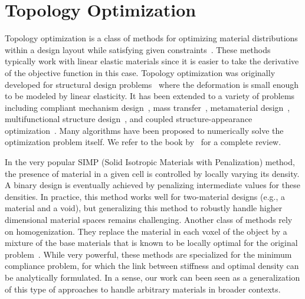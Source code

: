 \section{Topology Optimization}
Topology optimization is a class of methods for optimizing material distributions
within a design layout while satisfying given constraints~\citep{bendsoe2004topology}.
These methods typically work with linear elastic materials since it is easier to take the derivative of the objective function in this case.
Topology optimization was originally developed for structural design problems~\citep{bendsoe:1989:optimal} where the deformation is small enough to be modeled by linear elasticity.
It has been extended to a variety of problems including compliant mechanism design~\citep{Sigmund97Compliant},
mass transfer~\citep{challis:2009:level},
metamaterial design~\citep{Sigmund2000,cadman:2013:design},
multifunctional structure design~\citep{yan:2015:two},
and coupled structure-appearance optimization~\citep{Martinez:2015:SAO}.
Many algorithms have been proposed to numerically solve the optimization problem itself.
We refer to the book by~\citet{sigmund:2013:topology} for a complete review.

In the very popular SIMP (Solid Isotropic Materials with Penalization) method,
the presence of material in a given cell is controlled by locally varying its density.
A binary design is eventually achieved by penalizing intermediate values for these densities.
In practice, this method works well for two-material
designs (e.g., a material and a void), but generalizing this method
to robustly handle higher dimensional material spaces remains challenging.
Another class of methods rely on homogenization.
They replace the material in each voxel of the object by a mixture of the base materials that is known to be locally optimal for the
original problem~\citep{Allaire2012}.
While very powerful, these methods are specialized for the minimum compliance problem, for
which the link between stiffness and optimal density can be analytically formulated.
In a sense, our work can been seen as a generalization of this type of approaches to handle arbitrary materials in broader contexts.

